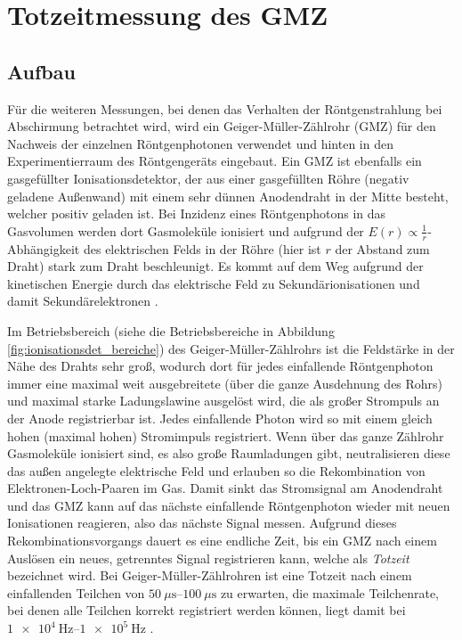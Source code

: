 \chapter{Totzeitmessung des GMZ}

\section{Aufbau}
\label{sec:gmz_theorie}
Für die weiteren Messungen, bei denen das Verhalten der Röntgenstrahlung bei Abschirmung betrachtet wird, wird ein Geiger-Müller-Zählrohr (GMZ) für den Nachweis der einzelnen Röntgenphotonen verwendet und hinten in den Experimentierraum des Röntgengeräts eingebaut. Ein GMZ ist ebenfalls ein gasgefüllter Ionisationsdetektor, der aus einer gasgefüllten Röhre (negativ geladene Außenwand) mit einem sehr dünnen Anodendraht in der Mitte besteht, welcher positiv geladen ist. Bei Inzidenz eines Röntgenphotons in das Gasvolumen werden dort Gasmoleküle ionisiert und aufgrund der $E(r)\propto\frac{1}{r}$-Abhängigkeit des elektrischen Felds in der Röhre (hier ist $r$ der Abstand zum Draht) stark zum Draht beschleunigt. Es kommt auf dem Weg aufgrund der kinetischen Energie durch das elektrische Feld zu Sekundärionisationen und damit Sekundärelektronen \cite[189-191]{kolanoskiwermerdetektoren}.


Im Betriebsbereich (siehe die Betriebsbereiche in Abbildung \ref{fig:ionisationsdet_bereiche}) des Geiger-Müller-Zählrohrs ist die Feldstärke in der Nähe des Drahts sehr groß, wodurch dort für jedes einfallende Röntgenphoton immer eine maximal weit ausgebreitete (über die ganze Ausdehnung des Rohrs) und maximal starke Ladungslawine ausgelöst wird, die als großer Strompuls an der Anode registrierbar ist.
Jedes einfallende Photon wird so mit einem gleich hohen (maximal hohen) Stromimpuls registriert. Wenn über das ganze Zählrohr Gasmoleküle ionisiert sind, es also große Raumladungen gibt, neutralisieren diese das außen angelegte elektrische Feld und erlauben so die Rekombination von Elektronen-Loch-Paaren im Gas. Damit sinkt das Stromsignal am Anodendraht und das GMZ kann auf das nächste einfallende Röntgenphoton wieder mit neuen Ionisationen reagieren, also das nächste Signal messen. Aufgrund dieses Rekombinationsvorgangs dauert es eine endliche Zeit, bis ein GMZ nach einem Auslösen ein neues, getrenntes Signal registrieren kann, welche als \textit{Totzeit} bezeichnet wird. Bei Geiger-Müller-Zählrohren ist eine Totzeit nach einem einfallenden Teilchen von $\SIrange{50}{100}{\mu\s}$ zu erwarten, die maximale Teilchenrate, bei denen alle Teilchen korrekt registriert werden können, liegt damit bei $\SIrange{1e4}{1e5}{\hertz}$ \cite[194-196]{kolanoskiwermerdetektoren}.


